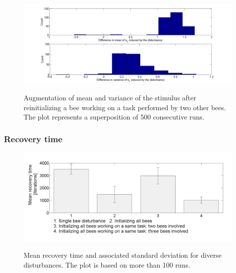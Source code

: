 \begin{figure}[ht!]
\begin{centering}
\includegraphics[scale=0.35]{figures/Augmentation2_2}
\label{fig:figure4}
\par\end{centering}

\begin{centering}
\caption{Augmentation of mean and variance of the stimulus after reinitializing a bee working on a task performed by two other bees. The plot represents a superposition of 500 consecutive runs.}

\par\end{centering}

\end{figure}

\subsubsection{Recovery time}

\begin{center}
\begin{figure}[ht!]
\includegraphics[scale=0.35]{figures/Figure3.png}
\label{fig:figure5}
\caption{Mean recovery time and associated standard deviation for diverse disturbances. The plot is based on more than 100 runs.}
\end{figure}
\par\end{center}

